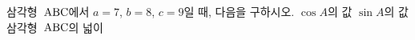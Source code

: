 삼각형~$\mathrm{ABC}$에서 $a=7$, $b=8$, $c=9$일 때, 다음을 \mbox{구하시오.}
 $\cos A$의 값
 $\sin A$의 값
 삼각형~$\mathrm{ABC}$의 넓이
